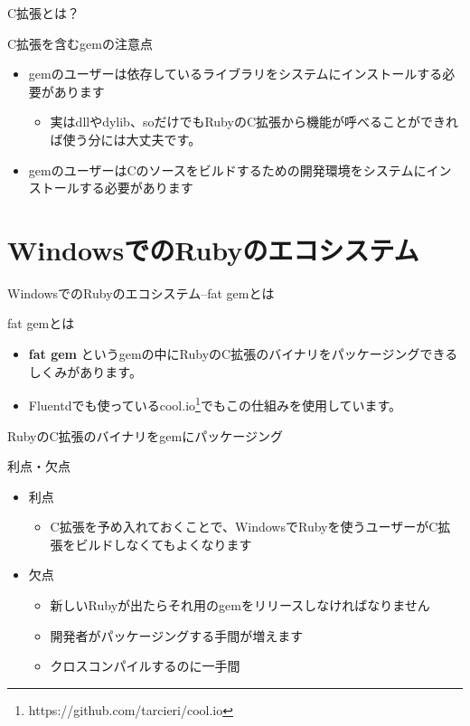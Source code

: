 \documentclass[12pt, unicode]{beamer}
\begin{document}
\begin{frame}{C拡張とは？}
  \begin{block}{C拡張を含むgemの注意点}
    \begin{itemize}
    \item gemのユーザーは依存しているライブラリをシステムにインストールする必要があります
       {
        \begin{itemize}
        \item \alert{実はdllやdylib、soだけでもRubyのC拡張から機能が呼べることができれば使う分には大丈夫です。}
        \end{itemize}
      }
    \item gemのユーザーはCのソースをビルドするための開発環境をシステムにインストールする必要があります
    \end{itemize}
  \end{block}
\end{frame}

\section[]{WindowsでのRubyのエコシステム}
\begin{frame}{WindowsでのRubyのエコシステム\small{–fat gemとは}}
  \begin{block}{fat gemとは}
    \begin{itemize}
    \item {\bf fat gem} というgemの中にRubyのC拡張のバイナリをパッケージングできるしくみがあります。
    \item Fluentdでも使っているcool.io\footnote[frame]{https://github.com/tarcieri/cool.io}でもこの仕組みを使用しています。
    \end{itemize}
  \end{block}
\end{frame}

\begin{frame}{RubyのC拡張のバイナリをgemにパッケージング}
  \begin{block}{利点・欠点}
    \begin{itemize}
    \item 利点
      \begin{itemize}
        \item C拡張を予め入れておくことで、WindowsでRubyを使うユーザーがC拡張をビルドしなくてもよくなります
      \end{itemize}
    \item 欠点
      \begin{itemize}
        \item 新しいRubyが出たらそれ用のgemをリリースしなければなりません
        \item 開発者がパッケージングする手間が増えます
        \item クロスコンパイルするのに一手間
      \end{itemize}
    \end{itemize}
  \end{block}
\end{frame}
\end{document}
